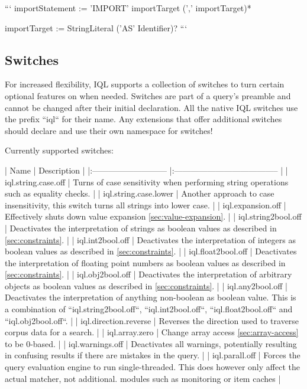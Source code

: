 \documentclass[11pt]{article}
\begin{document}
```
importStatement := 'IMPORT' importTarget (',' importTarget)*

importTarget := StringLiteral ('AS' Identifier)?
``` 

\subsection{Switches}
\label{sec:switches}

For increased flexibility, IQL supports a collection of switches to turn certain optional features on when needed. Switches are part of a query's preamble and cannot be changed after their initial declaration. All the native IQL switches use the prefix ``iql`` for their name. Any extensions that offer additional switches should declare and use their own namespace for switches!

Currently supported switches:

|    Name                     |   Description                          |
|:--------------------------- |:-------------------------------------- |
| iql.string.case.off         | Turns of case sensitivity when performing string operations such as equality checks. |
| iql.string.case.lower       | Another approach to case insensitivity, this switch turns all strings into lower case. |
| iql.expansion.off           | Effectively shuts down value expansion \cref{sec:value-expansion}. |
| iql.string2bool.off         | Deactivates the interpretation of strings as boolean values as described in \cref{sec:constraints}. |
| iql.int2bool.off            | Deactivates the interpretation of integers as boolean values as described in \cref{sec:constraints}. |
| iql.float2bool.off          | Deactivates the interpretation of floating point numbers as boolean values as described in \cref{sec:constraints}. |
| iql.obj2bool.off            | Deactivates the interpretation of arbitrary objects as boolean values as described in \cref{sec:constraints}. |
| iql.any2bool.off            | Deactivates the interpretation of anything non-boolean as boolean value. This is a combination of ``iql.string2bool.off``, ``iql.int2bool.off``, ``iql.float2bool.off`` and  ``iql.obj2bool.off``. |
| iql.direction.reverse       | Reverses the direction used to traverse corpus data for a search. |
| iql.array.zero              | Change array access \cref{sec:array-access} to be 0-based. |
| iql.warnings.off            | Deactivates all warnings, potentially resulting in confusing results if there are mistakes in the query. |
| iql.parall.off			  | Forces the query evaluation engine to run single-threaded. This does however only affect the actual matcher, not additional. modules such as monitoring or item caches |
\end{document}
